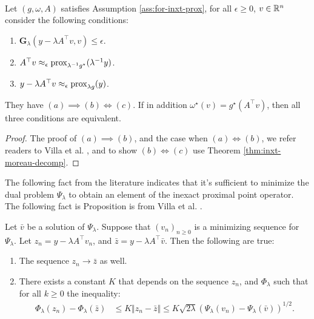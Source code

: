 \documentclass[12pt]{article}
\begin{document}
        \begin{theorem}\;\label{thm:dlty-gap-inxt-pp}\\
            Let $(g, \omega, A)$ satisfies Assumption \ref{ass:for-inxt-prox}, for all $\epsilon \ge 0$, $v \in \mathbb R^n$ consider the following conditions: 
            \begin{enumerate}[nosep]
                \item $\mathbf G_\lambda(y - \lambda A^\top v, v) \le \epsilon$. 
                \item $A^\top v \approx_\epsilon \operatorname{prox}_{\lambda^{-1}g^\star}(\lambda^{-1}y)$. 
                \item $y - \lambda A^\top v \approx_{\epsilon} \operatorname{prox}_{\lambda g}(y)$. 
            \end{enumerate}
            They have $(a)\implies (b) \iff (c)$. 
            If in addition $\omega^\star(v) = g^\star(A^\top v)$, then all three conditions are equivalent. 
        \end{theorem}
        \begin{proof}
            The proof of $(a) \implies (b)$, and the case when $(a)\iff (b)$, we refer readers to Villa et al. \cite[ Proposition 2.3]{villa_accelerated_2013}, and to show $(b) \iff (c)$ use Theorem \ref{thm:inxt-moreau-decomp}. 
        \end{proof}
        \par
        The following fact from the literature indicates that it's sufficient to minimize the dual problem $\Psi_\lambda$ to obtain an element of the inexact proximal point operator. 
        The following fact is Proposition is from Villa et al. \cite[Theorem 5.1]{villa_accelerated_2013}. 
        \begin{fact}\label{fact:minimizing-dual-pp}
            Let $\bar v$ be a solution of $\Psi_\lambda$. 
            Suppose that $(v_n)_{n \ge 0}$ is a minimizing sequence for $\Psi_\lambda$. 
            Let $z_n = y - \lambda A^\top v_n$, and $\bar z = y - \lambda A^\top \bar v$. 
            Then the following are true: 
            \begin{enumerate}[nosep]
                \item The sequence $z_n \rightarrow \bar z$ as well. 
                \item There exists a constant $K$ that depends on the sequence $z_n$, and $\Phi_\lambda$ such that for all $k \ge 0$ the inequality: 
                \begin{align*}
                    \Phi_{\lambda}(z_n) - \Phi_\lambda(\bar z) 
                    &\le K \Vert z_n - \bar z\Vert 
                    \le K \sqrt{2\lambda}(\Psi_\lambda(v_n) - \Psi_\lambda(\bar v))^{1/2}. 
                \end{align*}
            \end{enumerate}
            
        \end{fact}
\end{document}
